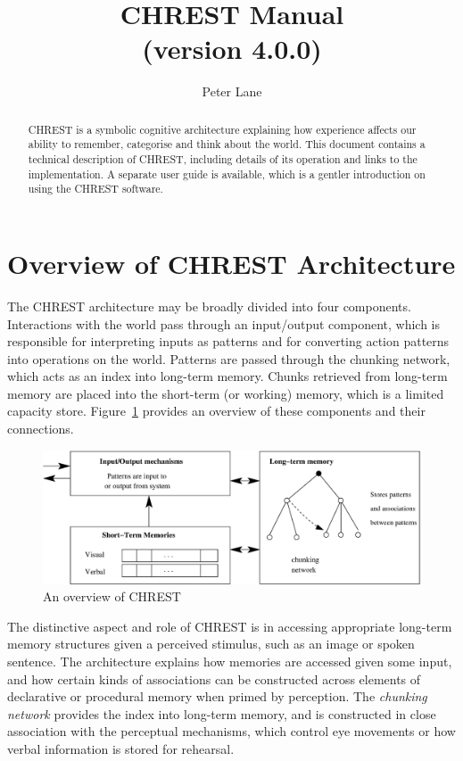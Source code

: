 \documentclass{article}
\title{CHREST Manual \\ (version 4.0.0)}
\author{Peter Lane}
\begin{document}
\maketitle

\begin{abstract}

\noindent CHREST is a symbolic cognitive architecture explaining how experience
affects our ability to remember, categorise and think about the world.  This
document contains a technical description of CHREST, including details of its
operation and links to the implementation.  A separate user guide is available,
which is a gentler introduction on using the CHREST software.

\end{abstract}

\tableofcontents
\newpage

\section{Overview of CHREST Architecture}

The CHREST architecture may be broadly divided into four components.
Interactions with the world pass through an input/output component, which is
responsible for interpreting inputs as patterns and for converting action
patterns into operations on the world.  Patterns are passed through the
chunking network, which acts as an index into long-term memory.  Chunks
retrieved from long-term memory are placed into the short-term (or working)
memory, which is a limited capacity store.  Figure~\ref{chrest-architecture}
provides an overview of these components and their connections.

\begin{figure}
\includegraphics[width=\textwidth]{figures/chrest.eps}
\caption{An overview of CHREST}
\label{chrest-architecture}
\end{figure}

The distinctive aspect and role of CHREST is in accessing appropriate long-term
memory structures given a perceived stimulus, such as an image or spoken
sentence.  The architecture explains how memories are accessed given some
input, and how certain kinds of associations can be constructed across elements
of declarative or procedural memory when primed by perception.  The {\em
chunking network} provides the index into long-term memory, and is constructed
in close association with the perceptual mechanisms, which control eye
movements or how verbal information is stored for rehearsal.
\end{document}
